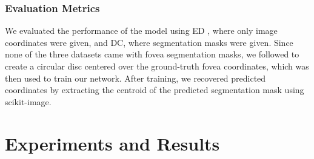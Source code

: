 \documentclass[hidelinks,runningheads]{llncs}
\begin{document}
\subsubsection{Evaluation Metrics}

We evaluated the performance of the model using \ac{ED} \cite{meyer_pixel-wise_2018}, where only image coordinates were given, and \ac{DC}, where segmentation masks were given.
Since none of the three datasets came with fovea segmentation masks, we followed \cite{meyer_pixel-wise_2018} to create a circular disc centered over the ground-truth fovea coordinates, which was then used to train our network.
After training, we recovered predicted coordinates by extracting the centroid of the predicted segmentation mask using scikit-image.










\section{Experiments and Results}
\end{document}
